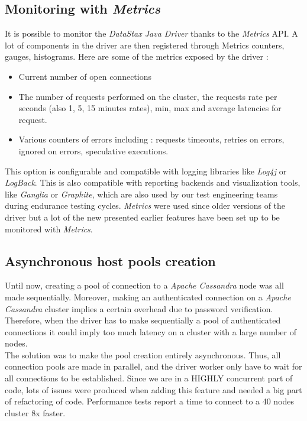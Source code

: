 \documentclass[a4paper]{report}
\newcommand{\djd}{\emph{DataStax Java Driver\xspace}}
\newcommand{\ca}{\emph{Apache Cassandra\xspace}}
\begin{document}
\subsection{Monitoring with \emph{Metrics}}
It is possible to monitor the \djd{} thanks to the \emph{Metrics} API. A lot of components in the driver are then registered through Metrics counters, gauges, histograms. Here are some of the metrics exposed by the driver : 
\begin{itemize}
   \item Current number of open connections
   \item The number of requests performed on the cluster, the requests rate per seconds (also 1, 5, 15 minutes rates), min, max and average latencies for request.
   \item Various counters of errors including : requests timeouts, retries on errors, ignored on errors, speculative executions.
\end{itemize}
This option is configurable and compatible with logging libraries like \emph{Log4j} or \emph{LogBack}. This is also compatible with reporting backends and visualization tools, like \emph{Ganglia} or \emph{Graphite}, which are also used by our test engineering teams during endurance testing cycles. \emph{Metrics} were used since older versions of the driver but a lot of the new presented earlier features have been set up to be monitored with \emph{Metrics}.


\subsection{Asynchronous host pools creation} %
\label{sub:asynchronous_host_pools_creation}
Until now, creating a pool of connection to a \ca{} node was all made sequentially. Moreover, making an authenticated connection on a \ca{} cluster implies a certain overhead due to password verification. Therefore, when the driver has to make sequentially a pool of authenticated connections it could imply too much latency on a cluster with a large number of nodes.\\
The solution was to make the pool creation entirely asynchronous. Thus, all connection pools are made in parallel, and the driver worker only have to wait for all connections to be established. Since we are in a HIGHLY concurrent part of code, lots of issues were produced when adding this feature and needed a big part of refactoring of code. Performance tests report a time to connect to a 40 nodes cluster 8x faster.
\end{document}
